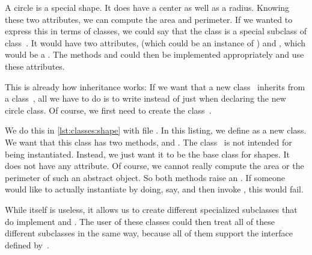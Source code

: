 A circle is a special shape.
It does have a center as well as a radius.
Knowing these two attributes, we can compute the area and perimeter.
If we wanted to express this in terms of classes, we could say that the class  is a special subclass of class~.
It would have two attributes,  (which could be an instance of ) and , which would be a .
The methods  and  could then be implemented appropriately and use these attributes.

This is already how inheritance works:
If we want that a new class~ inherits from a class~, all we have to do is to write  instead of just  when declaring the new circle class.
Of course, we first need to create the class~.

We do this in \cref{lst:classes:shape} with file .
In this listing, we define  as a new class.
We want that this class has two methods,  and .
The class~ is not intended for being instantiated.
Instead, we just want it to be the base class for  shapes.
It does not have any attribute.
Of course, we cannot really compute the area or the perimeter of such an abstract object.
So both methods raise an .
If someone would like to actually instantiate  by doing, say,  and then invoke , this would fail.

While  itself is useless, it allows us to create different specialized subclasses that do implement  and .
The user of these classes could then treat all of these different subclasses in the same way, because all of them support the interface defined by~.


